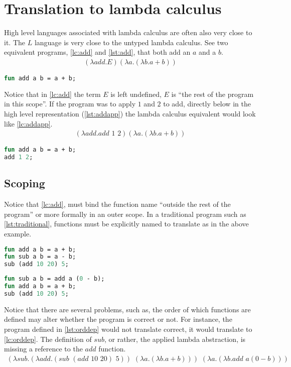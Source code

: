 \documentclass[11pt,oneside,a4paper]{report}
\begin{document}
\section{Translation to lambda calculus}
High level languages associated with lambda calculus are often also very close to it.
The $L$ language is very close to the untyped lambda calculus.
See two equivalent programs, \autoref{lc:add} and \autoref{lst:add}, that both add an $a$ and a $b$.
\begin{align}
(\lambda add . E)(\lambda a . (\lambda b . a + b))
\label{lc:add}
\end{align}
\begin{CenteredBox}
    
\end{CenteredBox}
\begin{lstlisting}[language=ML,caption={Add function},label={lst:add}]
fun add a b = a + b;
\end{lstlisting}
Notice that in \autoref{lc:add} the term $E$ is left undefined, $E$ is ``the rest of the program in this scope''.
If the program was to apply $1$ and $2$ to add, directly below in the high level representation (\autoref{lst:addapp}) the lambda calculus equivalent would look like \autoref{lc:addapp}.
\begin{align}
    (\lambda add . add \,\, 1 \,\, 2)(\lambda a . (\lambda b . a + b))
\label{lc:addapp}
\end{align}
\begin{lstlisting}[language=ML,caption={Add function applied},label={lst:addapp}]
fun add a b = a + b;
add 1 2;
\end{lstlisting}

\subsection{Scoping}\label{scoping}
Notice that \autoref{lc:add}, must bind the function name ``outside the rest of the program'' or more formally in an outer scope.
In a traditional program such as \autoref{lst:traditional}, functions must be explicitly named to translate as in the above example.
\begin{lstlisting}[language=ML,caption={A traditional program},label={lst:traditional}]
fun add a b = a + b;
fun sub a b = a - b;
sub (add 10 20) 5;
\end{lstlisting}
\begin{lstlisting}[language=ML,caption={An order dependant program},label={lst:orddep}]
fun sub a b = add a (0 - b);
fun add a b = a + b;
sub (add 10 20) 5;
\end{lstlisting}
Notice that there are several problems, such as, the order of which functions are defined may alter whether the program is correct or not.
For instance, the program defined in \autoref{lst:orddep} would not translate correct, it would translate to \autoref{lc:orddep}.
The definition of $sub$, or rather, the applied lambda abstraction, is missing a reference to the $add$ function.
\begin{align}
(\lambda sub . (\lambda add . (sub \,\, (add \,\, 10 \,\, 20) \,\, 5)) \,\, (\lambda a . (\lambda b . a + b))) \,\, (\lambda a . (\lambda b . add \,\, a (0 - b)))
\label{lc:orddep}
\end{align}
\end{document}
